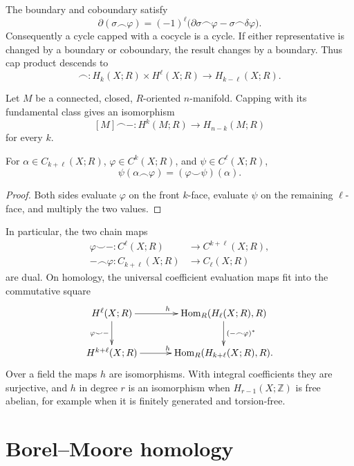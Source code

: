 \noindent
The boundary and coboundary satisfy
$$
\partial(\sigma\frown\varphi)
=(-1)^\ell
\bigl(
\partial\sigma\frown\varphi
-\sigma\frown\delta\varphi
\bigr).
$$
Consequently a cycle capped with a cocycle
is a cycle.  If either representative is
changed by a boundary or coboundary, the
result changes by a boundary.  Thus cap
product descends to
$$
\frown:
H_k(X;R)\times H^\ell(X;R)
\longrightarrow H_{k-\ell}(X;R).
$$

\begin{theorem}
\label{at-theorem-poincare-cap}
Let $M$ be a connected, closed,
$R$-oriented $n$-manifold.  Capping with
its fundamental class gives an isomorphism
$$
[M]\frown\mathord{-}:
H^k(M;R)\longrightarrow H_{n-k}(M;R)
$$
for every $k$.
\end{theorem}

\begin{proposition}
\label{at-proposition-cup-cap-adjunction}
For $\alpha\in C_{k+\ell}(X;R)$,
$\varphi\in C^k(X;R)$, and
$\psi\in C^\ell(X;R)$,
$$
\psi(\alpha\frown\varphi)
=(\varphi\smile\psi)(\alpha).
$$
\end{proposition}

\begin{proof}
Both sides evaluate $\varphi$ on the front
$k$-face, evaluate $\psi$ on the remaining
$\ell$-face, and multiply the two values.
\end{proof}

\noindent
In particular, the two chain maps
$$
\begin{aligned}
\varphi\smile\mathord{-}:
C^\ell(X;R)
&\longrightarrow C^{k+\ell}(X;R),\\
\mathord{-}\frown\varphi:
C_{k+\ell}(X;R)
&\longrightarrow C_\ell(X;R)
\end{aligned}
$$
are dual.  On homology, the universal
coefficient evaluation maps fit into the
commutative square
$$
\xymatrix@C=3.2em{
H^\ell(X;R)
  \ar[d]_{\varphi\smile\mathord{-}}
  \ar[r]^h
  &\operatorname{Hom}_R(H_\ell(X;R),R)
  \ar[d]^{
  (\mathord{-}\frown\varphi)^*} \\
H^{k+\ell}(X;R)
  \ar[r]^h
  &\operatorname{Hom}_R
  (H_{k+\ell}(X;R),R).
}
$$
Over a field the maps $h$ are
isomorphisms.  With integral coefficients
they are surjective, and $h$ in degree $r$
is an isomorphism when
$H_{r-1}(X;\mathbb{Z})$ is free abelian,
for example when it is finitely generated
and torsion-free.
\section{Borel--Moore homology}
\label{section-bm}

